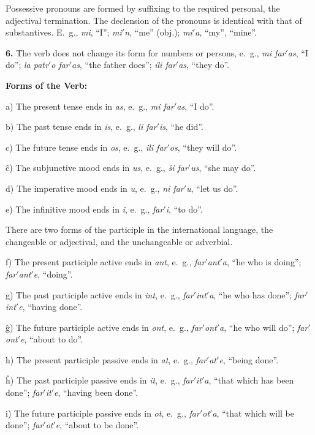 Possessive pronouns are formed by suffixing to the required personal, the adjectival termination. The declension of the pronouns is identical with that of substantives. E.~g., \emph{mi}, “I”; \emph{mi$'$n}, “me” (obj.); \emph{mi$'$a}, “my”, “mine”.

\textbf{6.} The verb does not change its form for numbers or persons, e.~g., \emph{mi far$'$as}, “I do”; \emph{la patr$'$o far$'$as}, “the father does”; \emph{ili far$'$as}, “they do”.

\begin{center}
\bf Forms of the Verb:
\end{center}

a) The present tense ends in \emph{as}, e.~g., \emph{mi far$'$as}, “I do”.

b) The past tense ends in \emph{is}, e.~g., \emph{li far$'$is}, “he did”.

c) The future tense ends in \emph{os}, e.~g., \emph{ili far$'$os}, “they will do”.

ĉ) The subjunctive mood ends in \emph{us}, e.~g., \emph{ŝi far$'$us}, “she may do”.

d) The imperative mood ends in \emph{u}, e.~g., \emph{ni far$'$u}, “let us do”.

e) The infinitive mood ends in \emph{i}, e.~g., \emph{far$'$i}, “to do”.

There are two forms of the participle in the international language, the changeable or adjectival, and the unchangeable or adverbial. 

f) The present participle active ends in \emph{ant}, e.~g., \emph{far$'$ant$'$a}, “he who is doing”; \emph{far$'$ant$'$e}, “doing”.

g) The past participle active ends in \emph{int}, e.~g., \emph{far$'$int$'$a}, “he who has done”; \emph{far$'$int$'$e}, “having done”.

ĝ) The future participle active ends in \emph{ont}, e.~g., \emph{far$'$ont$'$a}, “he who will do”; \emph{far$'$ont$'$e}, “about to do”.

h) The present participle passive ends in \emph{at}, e.~g., \emph{far$'$at$'$e}, “being done”.

ĥ) The past participle passive ends in \emph{it}, e.~g., \emph{far$'$it$'$a}, “that which has been done”; \emph{far$'$it$'$e}, “having been done”.

i) The future participle passive ends in \emph{ot}, e.~g., \emph{far$'$ot$'$a}, “that which will be done”; \emph{far$'$ot$'$e}, “about to be done”.

